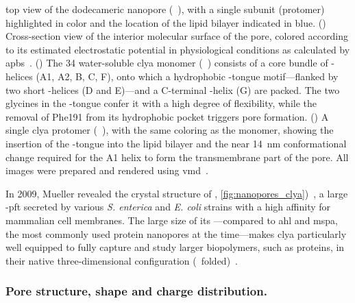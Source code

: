 \begin{figure*}[p]
{  %
  top view of the dodecameric  nanopore (~\cite{Peng-2019}), with a single
  subunit (protomer) highlighted in color and the location of the lipid bilayer indicated in blue.
  ()
  Cross-section view of the interior molecular surface of the pore, colored according to its estimated
  electrostatic potential in physiological conditions as calculated by
  \gls{apbs}~\cite{Baker-2001,Baker-2005}.
  ()
  The \SI{34}{\kDa} water-soluble \gls{clya} monomer (~\cite{Wallace-2000}) consists of a core
  bundle of \ta-helices (\ta A1, \ta A2, \ta B, \ta C, \ta F), onto which a hydrophobic \tb-tongue
  motif---flanked by two short \ta-helices (\ta D and \ta E)---and a C-terminal \ta-helix (\ta G) are packed.
  The two glycines in the \tb-tongue confer it with a high degree of flexibility, while the removal of Phe191
  from its hydrophobic pocket triggers pore formation.
  ()
  A single \gls{clya} protomer (~\cite{Peng-2019}), with the same coloring as the monomer, showing
  the insertion of the \ta-tongue into the lipid bilayer and the near \SI{14}{\nm} conformational change
  required for the \ta A1 helix to form the transmembrane part of the pore.
  All images were prepared and rendered using \gls{vmd}~\cite{Humphrey-1996,Stone-1998}.
  }\label{fig:nanopores_clya}
\end{figure*}

In 2009, Mueller \etal{} revealed the crystal structure of ,
\cref{fig:nanopores_clya})~\cite{Mueller-2009}, a large \ta-\gls{pft} secreted by various \textit{S. enterica}
and \textit{E. coli} strains with a high affinity for mammalian cell membranes. The large size of its
\lumen---compared to \gls{ahl} and \gls{mspa}, the most commonly used protein nanopores at the time---makes
\gls{clya} particularly well equipped to fully capture and study larger biopolymers, such as proteins, in
their native three-dimensional configuration (\ie~folded)~\cite{Soskine-2013,Soskine-Biesemans-2015}.


\subsubsection{Pore structure, shape and charge distribution.}
%

